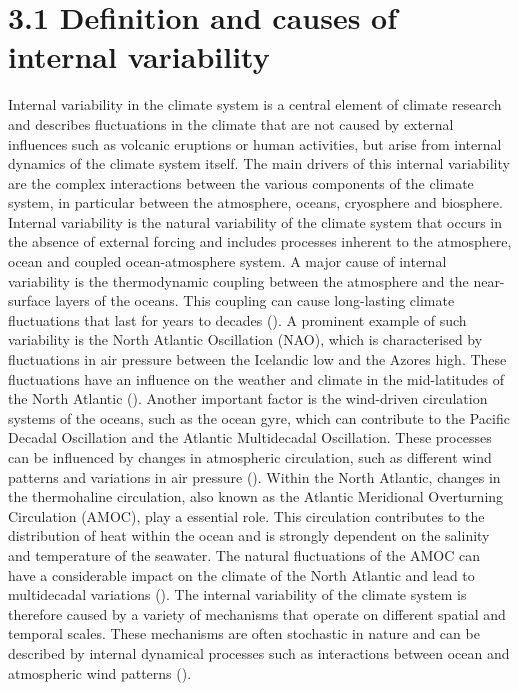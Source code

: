 \documentclass[
]{krantz}
\begin{document}
\section{3.1 Definition and causes of internal variability}\label{definition-and-causes-of-internal-variability}

Internal variability in the climate system is a central element of climate research and describes fluctuations in the climate that are not caused by external influences such as volcanic eruptions or human activities, but arise from internal dynamics of the climate system itself. The main drivers of this internal variability are the complex interactions between the various components of the climate system, in particular between the atmosphere, oceans, cryosphere and biosphere. Internal variability is the natural variability of the climate system that occurs in the absence of external forcing and includes processes inherent to the atmosphere, ocean and coupled ocean-atmosphere system.
A major cause of internal variability is the thermodynamic coupling between the atmosphere and the near-surface layers of the oceans. This coupling can cause long-lasting climate fluctuations that last for years to decades (\citet{deser}). A prominent example of such variability is the North Atlantic Oscillation (NAO), which is characterised by fluctuations in air pressure between the Icelandic low and the Azores high. These fluctuations have an influence on the weather and climate in the mid-latitudes of the North Atlantic (\citet{latif2009dynamics}).
Another important factor is the wind-driven circulation systems of the oceans, such as the ocean gyre, which can contribute to the Pacific Decadal Oscillation and the Atlantic Multidecadal Oscillation. These processes can be influenced by changes in atmospheric circulation, such as different wind patterns and variations in air pressure (\citet{deser}).
Within the North Atlantic, changes in the thermohaline circulation, also known as the Atlantic Meridional Overturning Circulation (AMOC), play a essential role. This circulation contributes to the distribution of heat within the ocean and is strongly dependent on the salinity and temperature of the seawater. The natural fluctuations of the AMOC can have a considerable impact on the climate of the North Atlantic and lead to multidecadal variations (\citet{latif2022natural}).
The internal variability of the climate system is therefore caused by a variety of mechanisms that operate on different spatial and temporal scales. These mechanisms are often stochastic in nature and can be described by internal dynamical processes such as interactions between ocean and atmospheric wind patterns (\citet{latif2009dynamics}).
\end{document}
